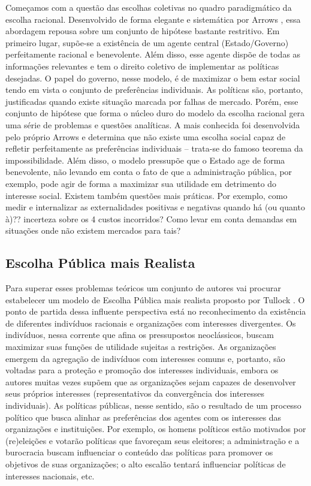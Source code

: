 Começamos com a questão das escolhas coletivas no quadro paradigmático da escolha racional. Desenvolvido de forma elegante e sistemática por Arrows \cite{Arrow1970SocialValues}, essa abordagem repousa sobre um conjunto de hipótese bastante restritivo. Em primeiro lugar, supõe-se a existência de um agente central (Estado/Governo) perfeitamente racional e benevolente. Além disso, esse agente dispõe de todas as informações relevantes e tem o direito coletivo de implementar as políticas desejadas. O papel do governo, nesse modelo, é de maximizar o bem estar social tendo em vista o conjunto de preferências individuais. As políticas são, portanto, justificadas quando existe situação marcada por falhas de mercado. Porém, esse conjunto de hipótese que forma o núcleo duro do modelo da escolha racional gera uma série de problemas e questões analíticas. A mais conhecida foi desenvolvida pelo próprio Arrows e determina que não existe uma escolha social capaz de refletir perfeitamente as preferências individuais – trata-se do famoso teorema da impossibilidade. Além disso, o modelo pressupõe que o Estado age de forma benevolente, não levando em conta o fato de que a administração pública, por exemplo, pode agir de forma a maximizar sua utilidade em detrimento do interesse social. Existem também questões mais práticas. Por exemplo, como medir e internalizar as externalidades positivas e negativas quando há (ou quanto à)?? incerteza sobre os 4 custos incorridos? Como levar em conta demandas em situações onde não existem mercados para tais?



\subsection{Escolha Pública mais Realista}

Para superar esses problemas teóricos um conjunto de autores vai procurar estabelecer um modelo de Escolha Pública mais realista proposto por Tullock \cite{Tullock1986TheBurocracy}. O ponto de partida dessa influente perspectiva está no reconhecimento da existência de diferentes indivíduos racionais e organizações com interesses divergentes. Os indivíduos, nessa corrente que afina os pressupostos neoclássicos, buscam maximizar suas funções de utilidade sujeitas a restrições. As organizações emergem da agregação de indivíduos com interesses comuns e, portanto, são voltadas para a proteção e promoção dos interesses individuais, embora os autores muitas vezes supõem que as organizações sejam capazes de desenvolver seus próprios interesses (representativos da convergência dos interesses individuais). As políticas públicas, nesse sentido, são o resultado de um processo político que busca alinhar as preferências dos agentes com os interesses das organizações e instituições. Por exemplo, os homens políticos estão motivados por (re)eleições e votarão políticas que favoreçam seus eleitores; a administração e a burocracia buscam influenciar o conteúdo das políticas para promover os objetivos de suas organizações; o alto escalão tentará influenciar políticas de interesses nacionais, etc.

